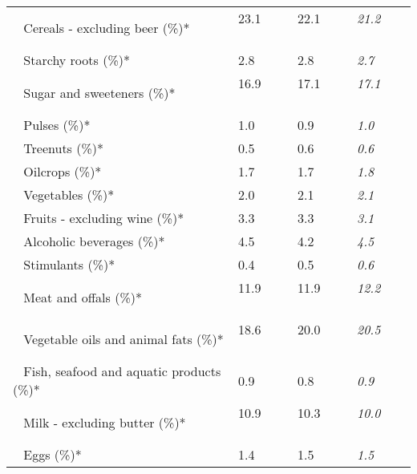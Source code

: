 \begin{tabular}{L{3.9cm} R{1cm} R{1cm} R{1cm}}
	 ~ Cereals - excluding beer (\%)* & 23.1 ~ \ \ & 22.1 ~ \ \ & \textit{21.2} ~ \ \ \\ 
	 ~ Starchy roots (\%)* & 2.8 ~ \ \ & 2.8 ~ \ \ & \textit{2.7} ~ \ \ \\ 
	 ~ Sugar and sweeteners (\%)* & 16.9 ~ \ \ & 17.1 ~ \ \ & \textit{17.1} ~ \ \ \\ 
	 ~ Pulses (\%)* & 1.0 ~ \ \ & 0.9 ~ \ \ & \textit{1.0} ~ \ \ \\ 
	 ~ Treenuts (\%)* & 0.5 ~ \ \ & 0.6 ~ \ \ & \textit{0.6} ~ \ \ \\ 
	 ~ Oilcrops (\%)* & 1.7 ~ \ \ & 1.7 ~ \ \ & \textit{1.8} ~ \ \ \\ 
	 ~ Vegetables (\%)* & 2.0 ~ \ \ & 2.1 ~ \ \ & \textit{2.1} ~ \ \ \\ 
	 ~ Fruits - excluding wine (\%)* & 3.3 ~ \ \ & 3.3 ~ \ \ & \textit{3.1} ~ \ \ \\ 
	 ~ Alcoholic beverages (\%)* & 4.5 ~ \ \ & 4.2 ~ \ \ & \textit{4.5} ~ \ \ \\ 
	 ~ Stimulants (\%)* & 0.4 ~ \ \ & 0.5 ~ \ \ & \textit{0.6} ~ \ \ \\ 
	 ~ Meat and offals (\%)* & 11.9 ~ \ \ & 11.9 ~ \ \ & \textit{12.2} ~ \ \ \\ 
	 ~ Vegetable oils and animal fats (\%)* & 18.6 ~ \ \ & 20.0 ~ \ \ & \textit{20.5} ~ \ \ \\ 
	 ~ Fish, seafood and aquatic products (\%)* & 0.9 ~ \ \ & 0.8 ~ \ \ & \textit{0.9} ~ \ \ \\ 
	 ~ Milk - excluding butter (\%)* & 10.9 ~ \ \ & 10.3 ~ \ \ & \textit{10.0} ~ \ \ \\ 
	 ~ Eggs (\%)* & 1.4 ~ \ \ & 1.5 ~ \ \ & \textit{1.5} ~ \ \ \\ 
       \toprule
      \end{tabular}
      \clearpage
{}
